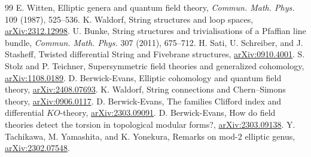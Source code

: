\documentclass[11pt]{article}
\theoremstyle{definition}
\begin{document}
\begin{thebibliography}{99}
 E. Witten, Elliptic genera and quantum field theory, \emph{Commun. Math. Phys.} 109 (1987), 525--536.
 K. Waldorf, String structures and loop spaces, \href{https://arxiv.org/abs/2312.12998}{arXiv:2312.12998}.
 U. Bunke, String structures and trivialisations of a Pfaffian line bundle, \emph{Commun. Math. Phys.} 307 (2011), 675--712.
 H. Sati, U. Schreiber, and J. Stasheff, Twisted differential String and Fivebrane structures, \href{https://arxiv.org/abs/0910.4001}{arXiv:0910.4001}.
 S. Stolz and P. Teichner, Supersymmetric field theories and generalized cohomology, \href{https://arxiv.org/abs/1108.0189}{arXiv:1108.0189}.
 D. Berwick-Evans, Elliptic cohomology and quantum field theory, \href{https://arxiv.org/abs/2408.07693}{arXiv:2408.07693}.
 K. Waldorf, String connections and Chern--Simons theory, \href{https://arxiv.org/abs/0906.0117}{arXiv:0906.0117}.
 D. Berwick-Evans, The families Clifford index and differential \(KO\)-theory, \href{https://arxiv.org/abs/2303.09091}{arXiv:2303.09091}.
 D. Berwick-Evans, How do field theories detect the torsion in topological modular forms?, \href{https://arxiv.org/abs/2303.09138}{arXiv:2303.09138}.
 Y. Tachikawa, M. Yamashita, and K. Yonekura, Remarks on mod-2 elliptic genus, \href{https://arxiv.org/abs/2302.07548}{arXiv:2302.07548}.
\end{thebibliography}
\end{document}
